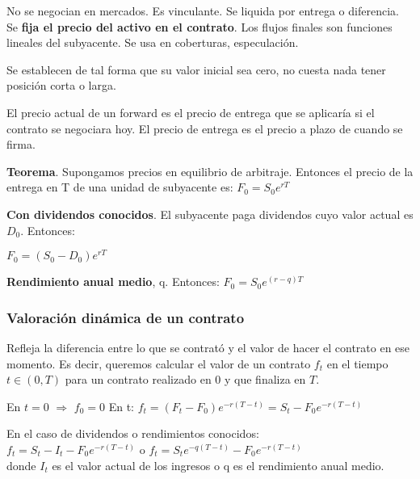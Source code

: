 \documentclass[
10pt, %
a4paper, %
oneside, %
headinclude,footinclude, %
BCOR5mm, %
]{scrartcl}
\newcommand{\n}[1]{\textbf{#1}}
\newcommand{\sub}[1]{_{#1}}
\newcommand{\pot}[1]{^{#1}}
\newcommand{\f}[1]{{\large{${#1}$}}}
\newcommand{\ent}[0]{\Rightarrow}
\newcounter{ex}
\begin{document}
		No se negocian en mercados. Es vinculante. Se liquida por entrega o diferencia. Se \n{fija el precio del activo en el contrato}. Los flujos finales son funciones lineales del subyacente. Se usa en coberturas, especulación. 

		Se establecen de tal forma que su valor inicial sea cero, no cuesta nada tener posición corta o larga.

		El precio actual de un forward es el precio de entrega que se aplicaría si el contrato se negociara hoy. El precio de entrega es el precio a plazo de cuando se firma.

		\vspace{0.2cm}

		\begin{framed}
		\n{Teorema}. Supongamos precios en equilibrio de arbitraje. Entonces el precio de la entrega en T de una unidad de subyacente es: \f{F\sub{0} = S\sub{0}e\pot{rT}}

		\n{Con dividendos conocidos}. El subyacente paga dividendos cuyo valor actual es \f{D\sub{0}}. Entonces:
		\begin{center} \f{F\sub{0} = (S\sub{0}-D\sub{0})e\pot{rT}} \end{center}

		\n{Rendimiento anual medio}, q. Entonces: \f{F\sub{0} = S\sub{0}e\pot{(r-q)T}} 
		\end{framed}


		\subsubsection{Valoración dinámica de un contrato}

			Refleja la diferencia entre lo que se contrató y el valor de hacer el contrato en ese momento. Es decir, queremos calcular el valor de un contrato \f{f\sub{t}} en el tiempo \f{t \in (0,T)} para un contrato realizado en \f{0} y que finaliza en \f{T}.

			En \f{t = 0} \f{\ent} \f{f\sub{0} = 0}
			En t: \f{f\sub{t} = (F\sub{t}-F\sub{0})e\pot{-r(T-t)} = S\sub{t}-F\sub{0}e\pot{-r(T-t)}}

			En el caso de dividendos o rendimientos conocidos: \\
			\f{f\sub{t} = S\sub{t}-I\sub{t}-F\sub{0}e\pot{-r(T-t)}} \hspace{0.3cm} o \hspace{0.3cm} \f{f\sub{t} = S\sub{t}e\pot{-q(T-t)}-F\sub{0}e\pot{-r(T-t)}} \\
			donde \f{I\sub{t}} es el valor actual de los ingresos o q es el rendimiento anual medio.
\end{document}
